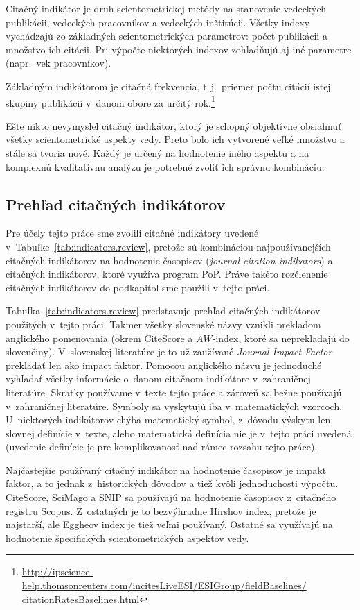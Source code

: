 Citačný indikátor je druh scientometrickej metódy na stanovenie 
vedeckých publikácii, vedeckých pracovníkov a vedeckých inštitúcii.  Všetky
indexy vychádzajú zo základných scientometrických parametrov: počet publikácii a
množstvo ich citácii.  Pri výpočte niektorých indexov zohľadňujú aj iné
parametre (napr.~vek pracovníkov).

Základným indikátorom je citačná frekvencia, t.\,j.~priemer počtu citácií istej
skupiny publikácií v~danom obore za určitý
rok.\footnote{\url{http://ipscience-help.thomsonreuters.com/incitesLiveESI/ESIGroup/fieldBaselines/
    citationRatesBaselines.html}}

Ešte nikto nevymyslel citačný indikátor, ktorý je schopný objektívne obsiahnuť
všetky scientometrické aspekty vedy.  Preto bolo ich vytvorené veľké množstvo a
stále sa tvoria nové.  Každý je určený na hodnotenie iného aspektu a na
komplexnú kvalitatívnu analýzu je potrebné zvoliť ich správnu kombináciu.

\subsection{Prehľad citačných indikátorov}

Pre účely tejto práce sme zvolili citačné indikátory uvedené
v~Tabuľke~\ref{tab:indicators.review}, pretože sú kombináciou najpoužívanejších
citačných indikátorov na hodnotenie časopisov (\emph{journal citation
  indikators}) a citačných indikátorov, ktoré využíva program PoP.  Práve takéto rozčlenenie citačných indikátorov do podkapitol sme
použili v~tejto práci.

Tabuľka~\ref{tab:indicators.review} predstavuje prehľad citačných indikátorov
použitých v~tejto práci.  Takmer všetky slovenské názvy vznikli prekladom
anglického pomenovania (okrem CiteScore a $AW$-index, ktoré sa neprekladajú do
slovenčiny).  V~slovenskej literatúre je to už zaužívané \emph{Journal Impact
  Factor} prekladať len ako impact faktor.  Pomocou anglického názvu je
jednoduché vyhľadať všetky informácie o~danom citačnom indikátore v~zahraničnej
literatúre.  Skratky používame v~texte tejto práce a zároveň sa bežne používajú
v~zahraničnej literatúre.  Symboly sa vyskytujú iba v~matematických vzorcoch.
U~niektorých indikátorov chýba matematický symbol, z~dôvodu výskytu len slovnej
definície v~texte, alebo matematická definícia nie je v~tejto práci uvedená
(uvedenie definície je pre komplikovanosť nad rámec rozsahu tejto práce).

Najčastejšie používaný citačný indikátor na hodnotenie časopisov je impakt
faktor, a to jednak z~historických dôvodov a tiež kvôli jednoduchosti výpočtu.
CiteScore, SciMago a SNIP sa používajú na hodnotenie časopisov z~citačného
registru Scopus.  Z~ostatných je to bezvýhradne Hirshov index, pretože je
najstarší, ale Eggheov index je tiež veľmi používaný.  Ostatné sa využívajú na
hodnotenie špecifických scientometrických aspektov vedy.

